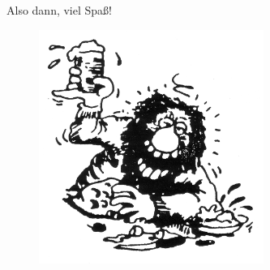 Also dann, viel Spaß!
\begin{figure}[!h]
 \begin{center}
  \includegraphics[height=3in]{bilder/thatsitkerl.jpg}
 \end{center}
\end{figure}
